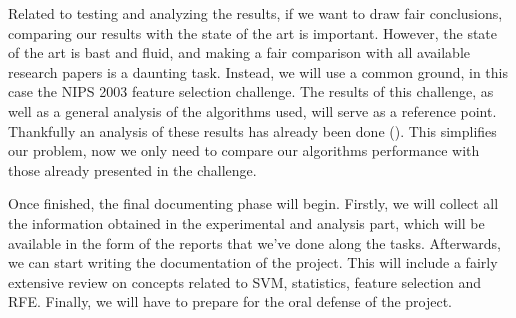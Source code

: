 Related to testing and analyzing the results, if we want to draw fair conclusions, comparing our results with the state of the art is important. However, the state of the art is bast and fluid, and making a fair comparison with all available research papers is a daunting task. Instead, we will use a common ground, in this case the NIPS 2003 feature selection challenge. The results of this challenge, as well as a general analysis of the algorithms used, will serve as a reference point. Thankfully an analysis of these results has already been done (\cite{guyon_result_2004}). This simplifies our problem, now we only need to compare our algorithms per\-for\-mance with those already pre\-sent\-ed in the challenge.

Once finished, the final documenting phase will begin. Firstly, we will collect all the information obtained in the experimental and analysis part, which will be available in the form of the reports that we've done along the tasks. Afterwards, we can start writing the documentation of the project. This will include a fairly extensive review on concepts related to SVM, statistics, feature selection and RFE. Finally, we will have to prepare for the oral defense of the project.

